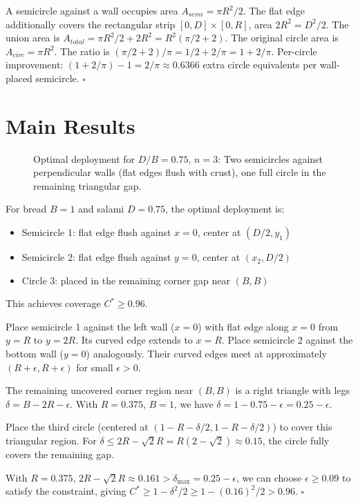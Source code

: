 \documentclass[12pt]{article}
\begin{document}
\begin{Proof}
A semicircle against a wall occupies area $A_{semi} = \pi R^2/2$. The flat edge
additionally covers the rectangular strip $[0,D] \times [0,R]$, area $2R^2 = D^2/2$.
The union area is $A_{total} = \pi R^2/2 + 2R^2 = R^2(\pi/2 + 2)$.
The original circle area is $A_{circ} = \pi R^2$.
The ratio is $(\pi/2 + 2)/\pi = 1/2 + 2/\pi = 1 + 2/\pi$.
Per-circle improvement: $(1 + 2/\pi) - 1 = 2/\pi \approx 0.6366$ extra circle
equivalents per wall-placed semicircle.
$\square$
\end{Proof}

\section{Main Results}

\begin{figure}[h]
\centering
\caption{\label{fig:deployment}Optimal deployment for $D/B = 0.75$, $n=3$:
Two semicircles against perpendicular walls (flat edges flush with crust),
one full circle in the remaining triangular gap.}
\end{figure}

\begin{theorem}[Optimal Configuration: $D/B = 0.75$, $n=3$]
For bread $B=1$ and salami $D=0.75$, the optimal deployment is:
\begin{itemize}
\item Semicircle 1: flat edge flush against $x=0$, center at $(D/2, y_1)$
\item Semicircle 2: flat edge flush against $y=0$, center at $(x_2, D/2)$
\item Circle 3: placed in the remaining corner gap near $(B,B)$
\end{itemize}
This achieves coverage $C^* \geq 0.96$.
\end{theorem}

\begin{Proof}[Sketch]
Place semicircle 1 against the left wall ($x=0$) with flat edge along $x=0$ from
$y=R$ to $y=2R$. Its curved edge extends to $x=R$. Place semicircle 2 against
the bottom wall ($y=0$) analogously. Their curved edges meet at approximately
$(R+\epsilon, R+\epsilon)$ for small $\epsilon > 0$.

The remaining uncovered corner region near $(B,B)$ is a right triangle with
legs $\delta = B - 2R - \epsilon$. With $R = 0.375$, $B = 1$, we have
$\delta = 1 - 0.75 - \epsilon = 0.25 - \epsilon$.

Place the third circle (centered at $(1-R-\delta/2, 1-R-\delta/2)$) to cover
this triangular region. For $\delta \leq 2R - \sqrt{2}R = R(2-\sqrt{2}) \approx 0.15$,
the circle fully covers the remaining gap.

With $R=0.375$, $2R-\sqrt{2}R \approx 0.161 > \delta_{\max} = 0.25 - \epsilon$,
we can choose $\epsilon \geq 0.09$ to satisfy the constraint, giving
$C^* \geq 1 - \delta^2/2 \geq 1 - (0.16)^2/2 > 0.96$.
$\square$
\end{Proof}
\end{document}
